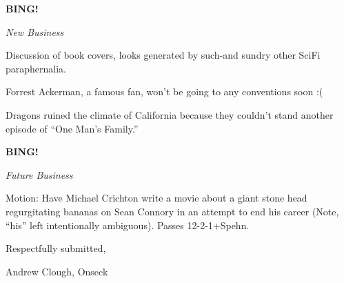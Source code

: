\documentclass[12pt]{article}
\newcommand{\bing}{{\bf BING!} }
\newcommand{\goto}[1]{\bing \vskip 12pt \centerline{{\em{#1}}}}
\begin{document}
\goto{New Business}

Discussion of book covers, looks generated by such-and sundry other SciFi paraphernalia.

Forrest Ackerman, a famous fan, won't be going to any conventions soon :(  

Dragons ruined the climate of California because they couldn't stand another episode of ``One Man's Family.''

\goto{Future Business}

Motion:  Have Michael Crichton write a movie about a giant stone head regurgitating bananas on Sean Connory in an attempt to end his career (Note, ``his'' left intentionally ambiguous).  Passes 12-2-1+Spehn.

\vspace{18pt}

\centerline{Respectfully submitted,}
\centerline{Andrew Clough, Onseck}
\end{document}
